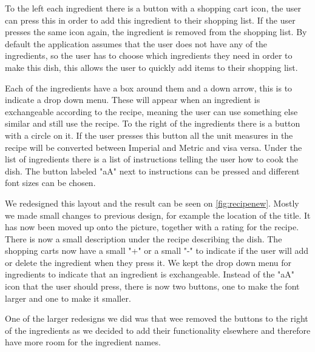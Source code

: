 To the left each ingredient there is a button with a shopping cart icon, the user can press this in order to add this ingredient to their shopping list. If the user presses the same icon again, the ingredient is removed from the shopping list. By default the application assumes that the user does not have any of the ingredients, so the user has to choose which ingredients they need in order to make this dish, this allows the user to quickly add items to their shopping list. 

Each of the ingredients have a box around them and a down arrow, this is to indicate a drop down menu. These will appear when an ingredient is exchangeable according to the recipe, meaning the user can use something else similar and still use the recipe. To the right of the ingredients there is a button with a circle on it. If the user presses this button all the unit measures in the recipe will be converted between Imperial and Metric and visa versa. Under the list of ingredients there is a list of instructions telling the user how to cook the dish. The button labeled "aA" next to instructions can be pressed and different font sizes can be chosen.

We redesigned this layout and the result can be seen on \autoref{fig:recipenew}. Mostly we made small changes to previous design, for example the location of the title. It has now been moved up onto the picture, together with a rating for the recipe. There is now a small description under the recipe describing the dish. The shopping carts now have a small "+" or a small "-" to indicate if the user will add or delete the ingredient when they press it. We kept the drop down menu for ingredients to indicate that an ingredient is exchangeable. Instead of the "aA" icon that the user should press, there is now two buttons, one to make the font larger and one to make it smaller.

One of the larger redesigns we did was that wee removed the buttons to the right of the ingredients as we decided to add their functionality elsewhere and therefore have more room for the ingredient names. 
 
